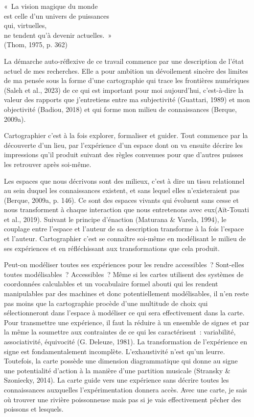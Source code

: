 \documentclass[
  a4paper,
  DIV=11,
  numbers=noendperiod]{scrreprt}
\begin{document}
\label{exergue1}
«~La vision magique du monde\\
est celle d'un univers de puissances\\
qui, virtuelles,\\
ne tendent qu'à devenir actuelles.~»\\
(Thom, 1975, p. 362)

La démarche auto-réflexive de ce travail commence par une description de
l'état actuel de mes recherches. Elle a pour ambition un dévoilement
sincère des limites de ma pensée sous la forme d'une cartographie qui
trace les frontières numériques (Saleh et al., 2023) de ce qui est
important pour moi aujourd'hui, c'est-à-dire la valeur des rapports que
j'entretiens entre ma subjectivité (Guattari, 1989) et mon objectivité
(Badiou, 2018) et qui forme mon milieu de connaissances (Berque, 2009a).

Cartographier c'est à la fois explorer, formaliser et guider. Tout
commence par la découverte d'un lieu, par l'expérience d'un espace dont
on va ensuite décrire les impressions qu'il produit suivant des règles
convenues pour que d'autres puisses les retrouver après soi-même.

Les espaces que nous décrivons sont des milieux, c'est à dire un tissu
relationnel au sein duquel les connaissances existent, et sans lequel
elles n'existeraient pas (Berque, 2009a, p. 146). Ce sont des espaces
vivants qui évoluent sans cesse et nous transforment à chaque
interaction que nous entretenons avec eux(Aït-Touati et al., 2019).
Suivant le principe d'énaction (Maturana \& Varela, 1994), le couplage
entre l'espace et l'auteur de sa description transforme à la fois
l'espace et l'auteur. Cartographier c'est se connaître soi-même en
modélisant le milieu de ses expériences et en réfléchissant aux
transformations que cela produit.

Peut-on modéliser toutes ses expériences pour les rendre accessibles~?
Sont-elles toutes modélisables~? Accessibles~? Même si les cartes
utilisent des systèmes de coordonnées calculables et un vocabulaire
formel abouti qui les rendent manipulables par des machines et donc
potentiellement modélisables, il n'en reste pas moins que la
cartographie procède d'une multitude de choix qui sélectionneront dans
l'espace à modéliser ce qui sera effectivement dans la carte. Pour
transmettre une expérience, il faut la réduire à un ensemble de signes
et par la même la soumettre aux contraintes de ce qui les
caractérisent~: variabilité, associativité, équivocité (G. Deleuze,
1981). La transformation de l'expérience en signe est fondamentalement
incomplète. L'exhaustivité n'est qu'un leurre. Toutefois, la carte
possède une dimension diagrammatique qui donne au signe une potentialité
d'action à la manière d'une partition musicale (Stransky \& Szoniecky,
2014). La carte guide vers une expérience sans décrire toutes les
connaissances auxquelles l'expérimentation donnera accès. Avec une
carte, je sais où trouver une rivière poissonneuse mais pas si je vais
effectivement pêcher des poissons et lesquels.
\end{document}
